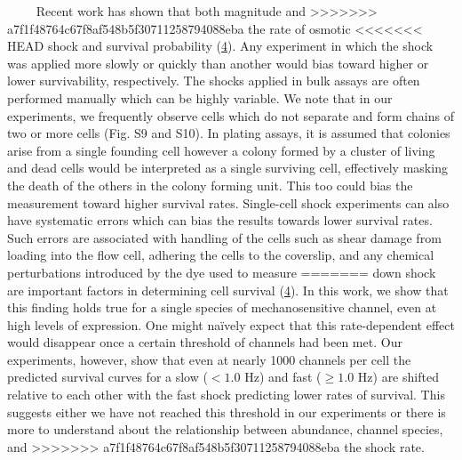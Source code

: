 ~~~~
Recent
work
has
shown
that
both
magnitude
and
>>>>>>> a7f1f48764c67f8af548b5f30711258794088eba
the
rate
of
osmotic
<<<<<<< HEAD
shock
and
survival
probability
(\protect\hyperlink{ref-bialecka-fornal2015}{4}).
Any
experiment
in
which
the
shock
was
applied
more
slowly
or
quickly
than
another
would
bias
toward
higher
or
lower
survivability,
respectively.
The
shocks
applied
in
bulk
assays
are
often
performed
manually
which
can be
highly
variable.
We
note
that
in our
experiments,
we
frequently
observe
cells
which
do not
separate
and
form
chains
of two
or
more
cells
(Fig.
S9 and
S10).
In
plating
assays,
it is
assumed
that
colonies
arise
from a
single
founding
cell
however
a
colony
formed
by a
cluster
of
living
and
dead
cells
would
be
interpreted
as a
single
surviving
cell,
effectively
masking
the
death
of the
others
in the
colony
forming
unit.
This
too
could
bias
the
measurement
toward
higher
survival
rates.
Single-cell
shock
experiments
can
also
have
systematic
errors
which
can
bias
the
results
towards
lower
survival
rates.
Such
errors
are
associated
with
handling
of the
cells
such
as
shear
damage
from
loading
into
the
flow
cell,
adhering
the
cells
to the
coverslip,
and
any
chemical
perturbations
introduced
by the
dye
used
to
measure
=======
down
shock
are
important
factors
in
determining
cell
survival
(\protect\hyperlink{ref-bialecka-fornal2015}{4}).
In
this
work,
we
show
that
this
finding
holds
true
for a
single
species
of
mechanosensitive
channel,
even
at
high
levels
of
expression.
One
might
naïvely
expect
that
this
rate-dependent
effect
would
disappear
once a
certain
threshold
of
channels
had
been
met.
Our
experiments,
however,
show
that
even
at
nearly
1000
channels
per
cell
the
predicted
survival
curves
for a
slow
(\(< 1.0\)
Hz)
and
fast
(\(\geq 1.0\)
Hz)
are
shifted
relative
to
each
other
with
the
fast
shock
predicting
lower
rates
of
survival.
This
suggests
either
we
have
not
reached
this
threshold
in our
experiments
or
there
is
more
to
understand
about
the
relationship
between
abundance,
channel
species,
and
>>>>>>> a7f1f48764c67f8af548b5f30711258794088eba
the
shock
rate.

